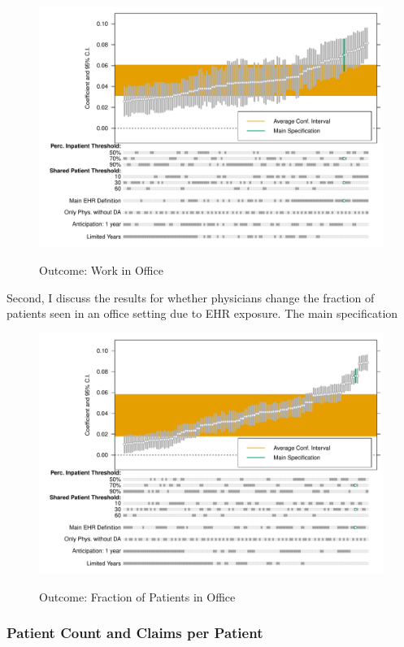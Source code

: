 \documentclass[12pt]{article}
\begin{document}
\begin{figure}[ht]
    \centering
    \caption{Outcome: Work in Office}
    \includegraphics[scale=.6]{Objects/office_ind_chart.pdf}
    \label{fig:work_chart}
\end{figure}

Second, I discuss the results for whether physicians change the fraction of patients seen in an office setting due to EHR exposure. The main specification

\begin{figure}[ht]
    \centering
    \caption{Outcome: Fraction of Patients in Office}
    \includegraphics[scale=.6]{Objects/office_frac_chart.pdf}
    \label{fig:fracoffice_chart}
\end{figure}


\subsubsection{Patient Count and Claims per Patient}
\end{document}
